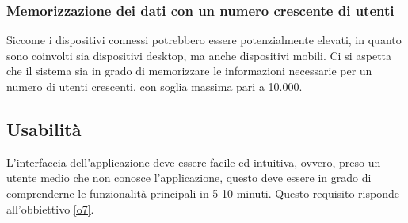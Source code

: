 \subsubsection{Memorizzazione dei dati con un numero crescente di utenti}
Siccome i dispositivi connessi potrebbero essere potenzialmente elevati, in quanto sono coinvolti sia dispositivi desktop, ma anche dispositivi mobili. Ci si aspetta che il sistema sia in grado di memorizzare le informazioni necessarie per un numero di utenti crescenti, con soglia massima pari a 10.000.

\subsection{Usabilità}
L’interfaccia dell’applicazione deve essere facile ed intuitiva, ovvero, preso un utente medio che non conosce l’applicazione, questo deve essere in grado di comprenderne le funzionalità principali in 5-10 minuti. Questo requisito risponde all'obbiettivo \ref{o7}.